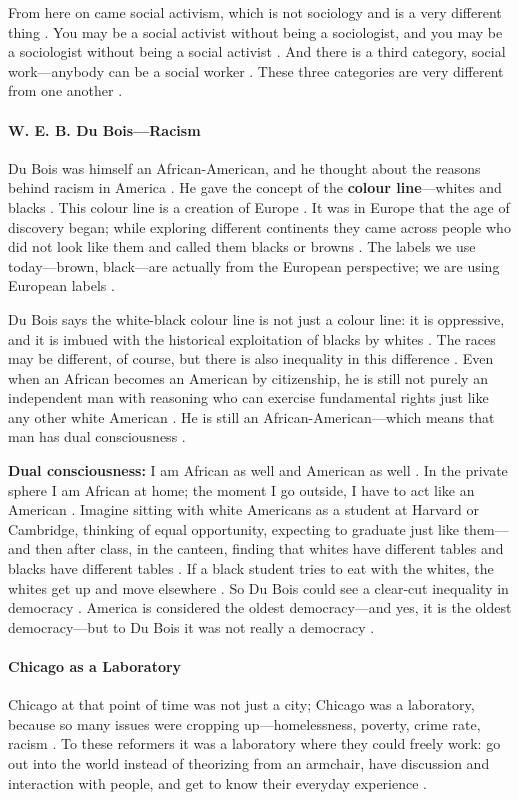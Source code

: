 From here on came social activism, which is not sociology and is a very different thing . You may be a social activist without being a sociologist, and you may be a sociologist without being a social activist . And there is a third category, social work---anybody can be a social worker . These three categories are very different from one another .

\paragraph{W. E. B. Du Bois---Racism}
Du Bois was himself an African-American, and he thought about the reasons behind racism in America . He gave the concept of the \textbf{colour line}---whites and blacks .
This colour line is a creation of Europe . It was in Europe that the age of discovery began; while exploring different continents they came across people who did not look like them and called them blacks or browns . The labels we use today---brown, black---are actually from the European perspective; we are using European labels .

Du Bois says the white-black colour line is not just a colour line: it is oppressive, and it is imbued with the historical exploitation of blacks by whites . The races may be different, of course, but there is also inequality in this difference .
Even when an African becomes an American by citizenship, he is still not purely an independent man with reasoning who can exercise fundamental rights just like any other white American . He is still an African-American---which means that man has dual consciousness .

\begin{KeyConcept}
\textbf{Dual consciousness:} I am African as well and American as well . In the private sphere I am African at home; the moment I go outside, I have to act like an American .
Imagine sitting with white Americans as a student at Harvard or Cambridge, thinking of equal opportunity, expecting to graduate just like them---and then after class, in the canteen, finding that whites have different tables and blacks have different tables . If a black student tries to eat with the whites, the whites get up and move elsewhere .
So Du Bois could see a clear-cut inequality in democracy . America is considered the oldest democracy---and yes, it is the oldest democracy---but to Du Bois it was not really a democracy .
\end{KeyConcept}

\paragraph{Chicago as a Laboratory}
Chicago at that point of time was not just a city; Chicago was a laboratory, because so many issues were cropping up---homelessness, poverty, crime rate, racism .
To these reformers it was a laboratory where they could freely work: go out into the world instead of theorizing from an armchair, have discussion and interaction with people, and get to know their everyday experience .

